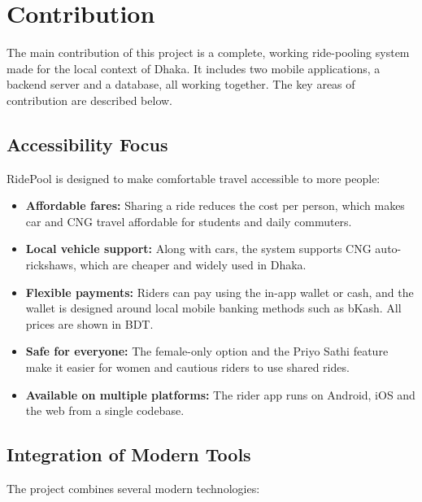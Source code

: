 \section{Contribution}
\label{sec:contribution}

The main contribution of this project is a complete, working ride-pooling
system made for the local context of Dhaka. It includes two mobile
applications, a backend server and a database, all working together. The key
areas of contribution are described below.

\subsection{Accessibility Focus}

RidePool is designed to make comfortable travel accessible to more people:

\begin{itemize}
  \item \textbf{Affordable fares:} Sharing a ride reduces the cost per person,
        which makes car and CNG travel affordable for students and daily
        commuters.
  \item \textbf{Local vehicle support:} Along with cars, the system supports
        CNG auto-rickshaws, which are cheaper and widely used in Dhaka.
  \item \textbf{Flexible payments:} Riders can pay using the in-app wallet or
        cash, and the wallet is designed around local mobile banking methods
        such as bKash. All prices are shown in BDT.
  \item \textbf{Safe for everyone:} The female-only option and the Priyo Sathi
        feature make it easier for women and cautious riders to use shared
        rides.
  \item \textbf{Available on multiple platforms:} The rider app runs on
        Android, iOS and the web from a single codebase.
\end{itemize}

\subsection{Integration of Modern Tools}

The project combines several modern technologies:

